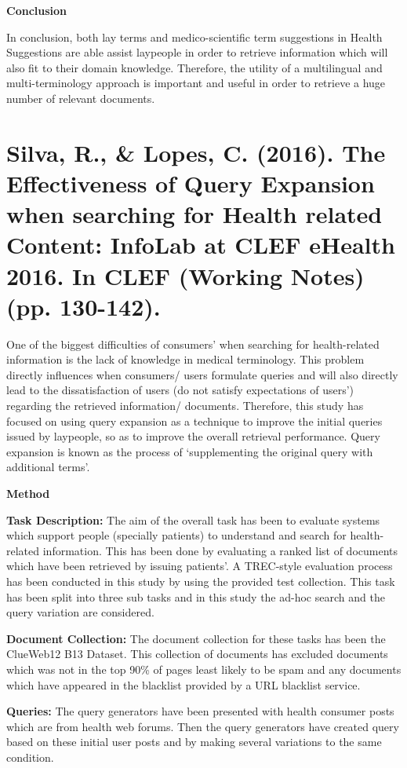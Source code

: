 \documentclass[]{article}
\begin{document}
\textbf{Conclusion}

In conclusion, both lay terms and medico-scientific term suggestions in Health Suggestions are able assist laypeople in order to retrieve information which will also fit to their domain knowledge. Therefore, the utility of a multilingual and multi-terminology approach is important and useful in order to retrieve a huge number of relevant documents.   

\section{Silva, R., \& Lopes, C. (2016). The Effectiveness of Query Expansion when searching for Health related Content: InfoLab at CLEF eHealth 2016. In CLEF (Working Notes) (pp. 130-142).}

One of the biggest difficulties of consumers’ when searching for health-related information is the lack of knowledge in medical terminology. This problem directly influences when consumers/ users formulate queries and will also directly lead to the dissatisfaction of users (do not satisfy expectations of users’) regarding the retrieved information/ documents. Therefore, this study has focused on using query expansion as a technique to improve the initial queries issued by laypeople, so as to improve the overall retrieval performance. Query expansion is known as the process of ‘supplementing the original query with additional terms’.    

\textbf{Method}

\textbf{Task Description:} The aim of the overall task has been to evaluate systems which support people (specially patients) to understand and search for health-related information. This has been done by evaluating a ranked list of documents which have been retrieved by issuing patients’. A TREC-style evaluation process has been conducted in this study by using the provided test collection. This task has been split into three sub tasks and in this study the ad-hoc search and the query variation are considered.  
    
\textbf{Document Collection:} The document collection for these tasks has been the ClueWeb12 B13 Dataset. This collection of documents has excluded documents which was not in the top 90\% of pages least likely to be spam and any documents which have appeared in the blacklist provided by a URL blacklist service. 

\textbf{Queries:} The query generators have been presented with health consumer posts which are from health web forums. Then the query generators have created query based on these initial user posts and by making several variations to the same condition.  
 
\end{document}
